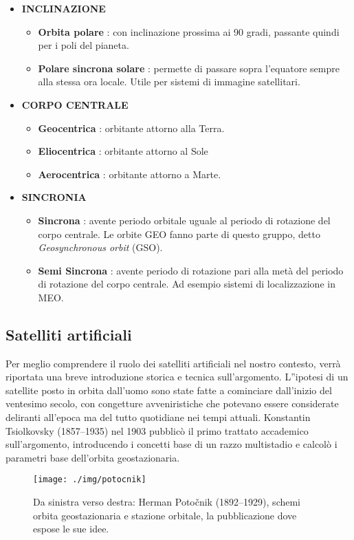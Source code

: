 \documentclass[12pt,a4paper,oneside]{book}
\begin{document}
\begin{itemize}
				\item{\bf INCLINAZIONE}	
					\begin{itemize}
						\item \textbf{Orbita polare} : con inclinazione prossima ai 90 gradi, passante quindi per i poli del pianeta.
						\item \textbf{Polare sincrona solare} : permette di passare sopra l'equatore sempre alla stessa ora locale. Utile per sistemi di immagine satellitari.
					\end{itemize}
					
				\item{\bf CORPO CENTRALE}	
					\begin{itemize}
						\item \textbf{Geocentrica} : orbitante attorno alla Terra.
						\item \textbf{Eliocentrica} : orbitante attorno al Sole
						\item \textbf{Aerocentrica} : orbitante attorno a Marte.
					\end{itemize}
				
				
				\item{\bf SINCRONIA}	
					\begin{itemize}
						\item \textbf{Sincrona} : avente periodo orbitale uguale al periodo di rotazione del corpo centrale. Le orbite GEO fanno parte di questo gruppo, detto \textit{Geosynchronous orbit} (GSO).
						\item \textbf{Semi Sincrona} : avente periodo di rotazione pari alla metà del periodo di rotazione del corpo centrale. Ad esempio sistemi di localizzazione in MEO.
					\end{itemize}
			\end{itemize}								
						
			\subsection{Satelliti artificiali}
			Per meglio comprendere il ruolo dei satelliti artificiali nel nostro contesto, verrà riportata una breve introduzione storica e tecnica sull'argomento. L''ipotesi di un satellite posto in orbita dall'uomo sono state fatte a cominciare dall'inizio del ventesimo secolo, con congetture avveniristiche che potevano essere considerate deliranti all'epoca ma del tutto quotidiane nei tempi attuali. Konstantin Tsiolkovsky (1857–1935) nel 1903 pubblicò il primo trattato accademico sull'argomento, introducendo i concetti base di un razzo multistadio e calcolò i parametri base dell'orbita geostazionaria. 
			\begin{figure}[h]
				\centering
				\texttt{[image: ./img/potocnik]}
				\caption{Da sinistra verso destra: Herman Potočnik (1892–1929), schemi orbita geostazionaria e stazione orbitale, la pubblicazione dove espose le sue idee.}
				\label{fig:poto}
			\end{figure}			
			
\end{document}
